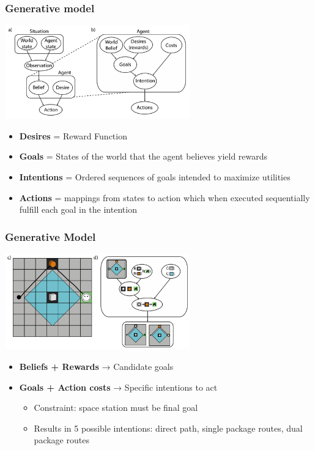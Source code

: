 \documentclass{beamer}
\begin{document}
\begin{frame}
\frametitle{Generative model}
\begin{center}
\includegraphics[width=0.6\textwidth]{generative_model.png}
\end{center}

\vspace{0.5cm}
\begin{itemize}
    \pause
    \item \textbf{Desires} = Reward Function
    \pause
    \item \textbf{Goals} = States of the world that the agent believes yield rewards
    \pause
    \item \textbf{Intentions} = Ordered sequences of goals intended to maximize utilities
    \pause
    \item \textbf{Actions} = mappings from states to action which when executed sequentially fulfill each goal in the intention
\end{itemize}
\end{frame}

\begin{frame}
\frametitle{Generative Model}
\begin{center}
\includegraphics[width=0.6\textwidth]{generative_model2.png}
\end{center}

\vspace{0.3cm}
\begin{itemize}
    \pause
    \item \textbf{Beliefs + Rewards} → Candidate goals
    \pause
    \item \textbf{Goals + Action costs} → Specific intentions to act
    \pause
    \begin{itemize}
        \item Constraint: space station must be final goal
        \item Results in 5 possible intentions: direct path, single package routes, dual package routes
    \end{itemize}
\end{itemize}
\end{frame}
\end{document}
